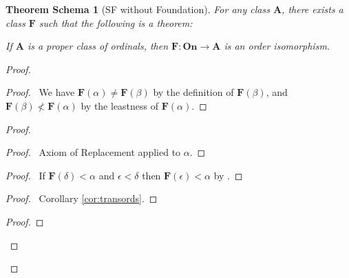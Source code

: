 \documentclass{book}
\let\qed\relax
\newtheorem{thms}[ax]{Theorem Schema}
\theoremstyle{definition}
\begin{document}
\begin{thms}[SF without Foundation]
\label{thms:wellorderclass}
For any class $\mathbf{A}$, there exists a class $\mathbf{F}$ such that the following is a theorem:

If $\mathbf{A}$ is a proper class of ordinals, then $\mathbf{F} : \mathbf{On} \rightarrow \mathbf{A}$ is an order isomorphism.
\end{thms}

\begin{proof}
\pf
{}
\begin{proof}
	\pf\ We have $\mathbf{F}(\alpha) \neq \mathbf{F}(\beta)$ by the definition of $\mathbf{F}(\beta)$, and $\mathbf{F}(\beta) \nless \mathbf{F}(\alpha)$ by the leastness of $\mathbf{F}(\alpha)$.
\end{proof}
\begin{proof}
	\begin{proof}
		\pf\ Axiom of Replacement applied to $\alpha$.
	\end{proof}
	\begin{proof}
		\pf\ If $\mathbf{F}(\delta) < \alpha$ and $\epsilon < \delta$ then $\mathbf{F}(\epsilon) < \alpha$ by .
	\end{proof}
	\begin{proof}
		\pf\ Corollary \ref{cor:transords}.
	\end{proof}
	\begin{proof}
	\end{proof}
\end{proof}
\qed
\end{proof}
\end{document}
